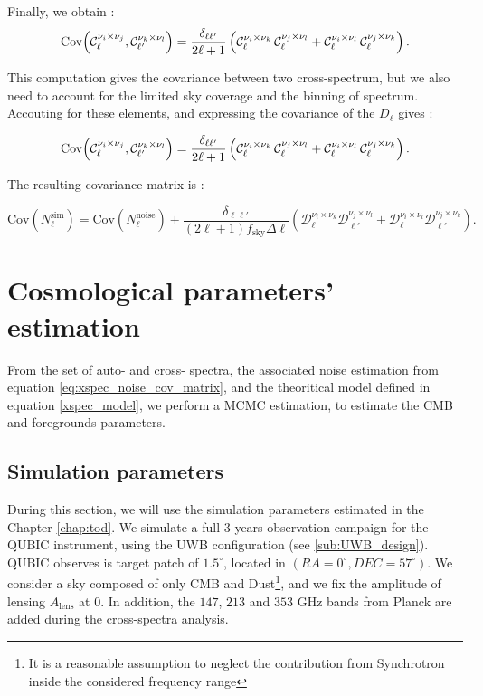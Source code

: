 \documentclass[../../thesis.tex]{subfiles}
\begin{document}
Finally, we obtain : 
\begin{equation}
    \mathrm{Cov}\!\left(\mathcal{C}_{\ell}^{\nu_{i} \times \nu_{j}}, \mathcal{C}_{\ell'}^{\nu_{k} \times \nu_{l}}\right) = \frac{\delta_{\ell\ell'}}{2\ell+1} \left( \mathcal{C}_{\ell}^{\nu_{i} \times \nu_{k}}\,\mathcal{C}_{\ell}^{\nu_{j} \times \nu_{l}} + \mathcal{C}_{\ell}^{\nu_{i} \times \nu_{l}}\,\mathcal{C}_{\ell}^{\nu_{j} \times \nu_{k}} \right).
\end{equation}

This computation gives the covariance between two cross-spectrum, but we also need to account for the limited sky coverage and the binning of spectrum. Accouting for these elements, and expressing the covariance of the $D_\ell$ gives : 

\begin{equation}
    \mathrm{Cov}\!\left(\mathcal{C}_{\ell}^{\nu_{i} \times \nu_{j}}, \mathcal{C}_{\ell'}^{\nu_{k} \times \nu_{l}}\right) = \frac{\delta_{\ell\ell'}}{2\ell+1} \left( \mathcal{C}_{\ell}^{\nu_{i} \times \nu_{k}}\,\mathcal{C}_{\ell}^{\nu_{j} \times \nu_{l}} + \mathcal{C}_{\ell}^{\nu_{i} \times \nu_{l}}\,\mathcal{C}_{\ell}^{\nu_{j} \times \nu_{k}} \right).
\end{equation}

The resulting covariance matrix is : 

\begin{equation}
    \boxed{\text{Cov} \left(N_{\ell}^{\text{sim}}\right) = \text{Cov}\left( N_{\ell}^{\text{noise}}\right) + \frac{\delta_{\ell \ell'}}{\left( 2 \ell + 1\right) f_{\text{sky}} \Delta \ell} \left( \mathcal{D}_{\ell}^{\nu_i \times \nu_k} \mathcal{D}_{\ell'}^{\nu_j \times \nu_l} + \mathcal{D}_{\ell}^{\nu_i \times \nu_l} \mathcal{D}_{\ell'}^{\nu_j \times \nu_k} \right).} \label{eq:xspec_noise_cov_matrix}
\end{equation}

\section{Cosmological parameters' estimation}


From the set of auto- and cross- spectra, the associated noise estimation from equation \ref{eq:xspec_noise_cov_matrix}, and the theoritical model defined in equation \ref{xspec_model}, we perform a MCMC estimation, to estimate the CMB and foregrounds parameters. 

\subsection{Simulation parameters}

During this section, we will use the simulation parameters estimated in the Chapter \ref{chap:tod}. We simulate a full 3 years observation campaign for the QUBIC instrument, using the UWB configuration (see \ref{sub:UWB_design}). QUBIC observes is target patch of $1.5^\circ$, located in $(RA=0^\circ, DEC=57^\circ)$. We consider a sky composed of only CMB and Dust\footnote{It is a reasonable assumption to neglect the contribution from Synchrotron inside the considered frequency range}, and we fix the amplitude of lensing $A_{\text{lens}}$ at $0$. In addition, the $147$, $213$ and $353$ GHz bands from Planck are added during the cross-spectra analysis. 
\end{document}
